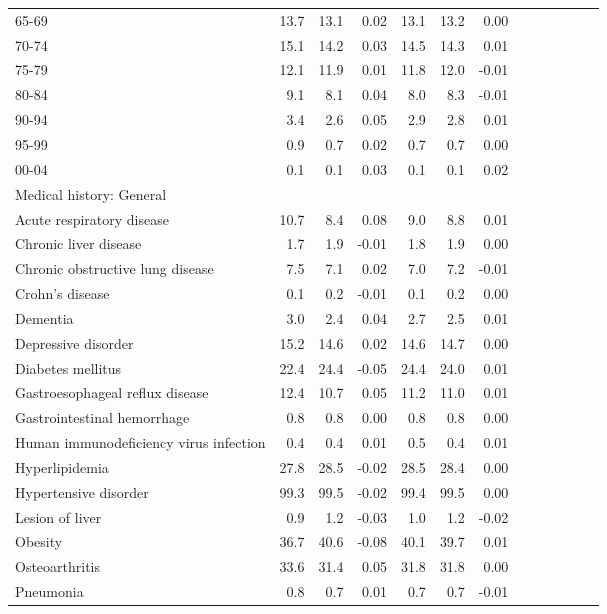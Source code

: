 \documentclass[11pt,]{article}
\begin{document}
\begin{longtable}{lrrrrrrrrrrrr}
      65-69 & 13.7 &  13.1 &  0.02 & 13.1 &  13.2 &  0.00 \\ 
      70-74 & 15.1 &  14.2 &  0.03 & 14.5 &  14.3 &  0.01 \\ 
      75-79 & 12.1 &  11.9 &  0.01 & 11.8 &  12.0 & -0.01 \\ 
      80-84 &  9.1 &   8.1 &  0.04 &  8.0 &   8.3 & -0.01 \\ 
      90-94 &  3.4 &   2.6 &  0.05 &  2.9 &   2.8 &  0.01 \\ 
      95-99 &  0.9 &   0.7 &  0.02 &  0.7 &   0.7 &  0.00 \\ 
      00-04 &  0.1 &   0.1 &  0.03 &  0.1 &   0.1 &  0.02 \\ 
  Medical history: General &    &     &     &    &     &     \\ 
      Acute respiratory disease & 10.7 &   8.4 &  0.08 &  9.0 &   8.8 &  0.01 \\ 
      Chronic liver disease &  1.7 &   1.9 & -0.01 &  1.8 &   1.9 &  0.00 \\ 
      Chronic obstructive lung disease &  7.5 &   7.1 &  0.02 &  7.0 &   7.2 & -0.01 \\ 
      Crohn's disease &  0.1 &   0.2 & -0.01 &  0.1 &   0.2 &  0.00 \\ 
      Dementia &  3.0 &   2.4 &  0.04 &  2.7 &   2.5 &  0.01 \\ 
      Depressive disorder & 15.2 &  14.6 &  0.02 & 14.6 &  14.7 &  0.00 \\ 
      Diabetes mellitus & 22.4 &  24.4 & -0.05 & 24.4 &  24.0 &  0.01 \\ 
      Gastroesophageal reflux disease & 12.4 &  10.7 &  0.05 & 11.2 &  11.0 &  0.01 \\ 
      Gastrointestinal hemorrhage &  0.8 &   0.8 &  0.00 &  0.8 &   0.8 &  0.00 \\ 
      Human immunodeficiency virus infection &  0.4 &   0.4 &  0.01 &  0.5 &   0.4 &  0.01 \\ 
      Hyperlipidemia & 27.8 &  28.5 & -0.02 & 28.5 &  28.4 &  0.00 \\ 
      Hypertensive disorder & 99.3 &  99.5 & -0.02 & 99.4 &  99.5 &  0.00 \\ 
      Lesion of liver &  0.9 &   1.2 & -0.03 &  1.0 &   1.2 & -0.02 \\ 
      Obesity & 36.7 &  40.6 & -0.08 & 40.1 &  39.7 &  0.01 \\ 
      Osteoarthritis & 33.6 &  31.4 &  0.05 & 31.8 &  31.8 &  0.00 \\ 
      Pneumonia &  0.8 &   0.7 &  0.01 &  0.7 &   0.7 & -0.01 \\ 

\end{longtable}
\end{document}
